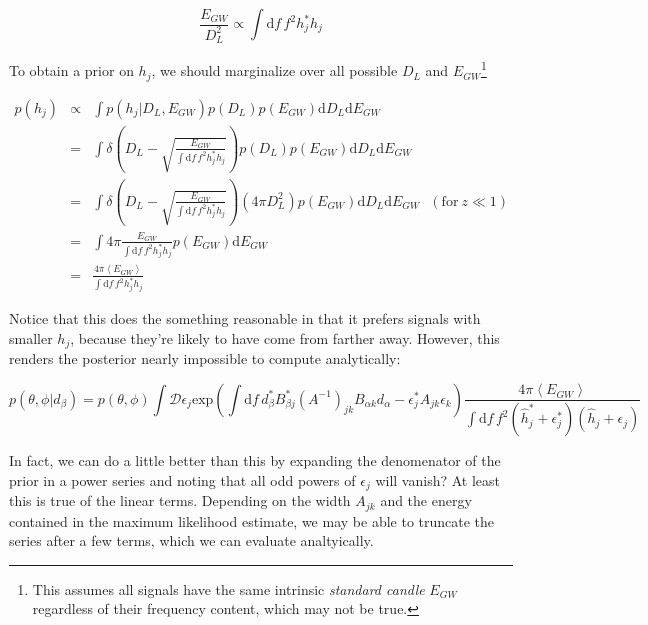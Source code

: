 \documentclass[10pt]{article}
\begin{document}
\begin{equation}
\frac{E_{GW}}{D_L^2} \propto \int\mathrm{d}f\, f^2 h_j^\ast h_j
\end{equation}

To obtain a prior on $h_j$, we should marginalize over all possible $D_L$ and $E_{GW}$\footnote{This assumes all signals have the same intrinsic \emph{standard candle} $E_{GW}$ regardless of their frequency content, which may not be true.}

\begin{eqnarray}
p(h_j) & \propto & \int p(h_j|D_L, E_{GW})p(D_L)p(E_{GW})\mathrm{d}D_L\mathrm{d}E_{GW} \\
& = & \int \delta\left( D_L - \sqrt{\frac{E_{GW}}{\int\mathrm{d}f\,f^2h_j^\ast h_j}} \right) p(D_L) p(E_{GW})\mathrm{d}D_L\mathrm{d}E_{GW} \nonumber \\
& = & \int \delta\left( D_L - \sqrt{\frac{E_{GW}}{\int\mathrm{d}f\,f^2h_j^\ast h_j}} \right) (4\pi D_L^2) p(E_{GW})\mathrm{d}D_L\mathrm{d}E_{GW} \ \ \ (\mathrm{for}\ z\ll 1) \nonumber\\
& = & \int 4\pi \frac{E_{GW}}{\int\mathrm{d}f\, f^2h_j^\ast h_j}p(E_{GW})\mathrm{d}E_{GW} \nonumber \\
& = & \frac{4\pi \left<E_{GW}\right>}{\int\mathrm{d}f\, f^2h_j^\ast h_j}
\end{eqnarray}

Notice that this does the something reasonable in that it prefers signals with smaller $h_j$, because they're likely to have come from farther away. However, this renders the posterior nearly impossible to compute analytically:

\begin{equation}
p(\theta,\phi|d_\beta) = p(\theta,\phi)\int\mathcal{D}\epsilon_j \mathrm{exp}\left( \int\mathrm{d}f\, d_\beta^\ast B_{\beta j}^\ast \left(A^{-1}\right)_{jk} B_{\alpha k} d_\alpha - \epsilon_j^\ast A_{jk} \epsilon_k \right) \frac{4\pi \left<E_{GW}\right>}{\int\mathrm{d}f\, f^2 (\hat{h}_j^\ast+\epsilon_j^\ast) (\hat{h}_j+\epsilon_j)}
\end{equation}

In fact, we can do a little better than this by expanding the denomenator of the prior in a power series and noting that all odd powers of $\epsilon_j$ will vanish? At least this is true of the linear terms. Depending on the width $A_{jk}$ and the energy contained in the maximum likelihood estimate, we may be able to truncate the series after a few terms, which we can evaluate analtyically. 
\end{document}
